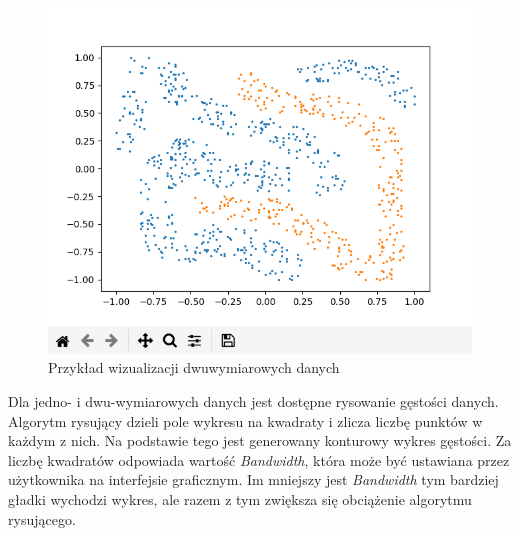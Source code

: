 \documentclass[paper=a4, fontsize=11pt]{scrartcl} %
\numberwithin{equation}{section} %
\numberwithin{figure}{section} %
\begin{document}
    \begin{figure}[H]
        \begin{center}
            \includegraphics[scale=0.65]{./img/2dplot_ex1.png}
            \caption{Przykład wizualizacji dwuwymiarowych danych}
            \label{fig:visualization}
        \end{center}
    \end{figure}

    \par Dla jedno- i dwu-wymiarowych danych jest dostępne rysowanie gęstości danych. Algorytm
    rysujący dzieli pole wykresu na kwadraty i zlicza liczbę punktów w każdym z nich. Na
    podstawie tego jest generowany konturowy wykres gęstości. Za liczbę kwadratów odpowiada
    wartość \textit{Bandwidth}, która może być ustawiana przez użytkownika na interfejsie
    graficznym. Im mniejszy jest \textit{Bandwidth} tym bardziej gładki wychodzi wykres, ale
    razem z tym zwiększa się obciążenie algorytmu rysującego. 
\end{document}
